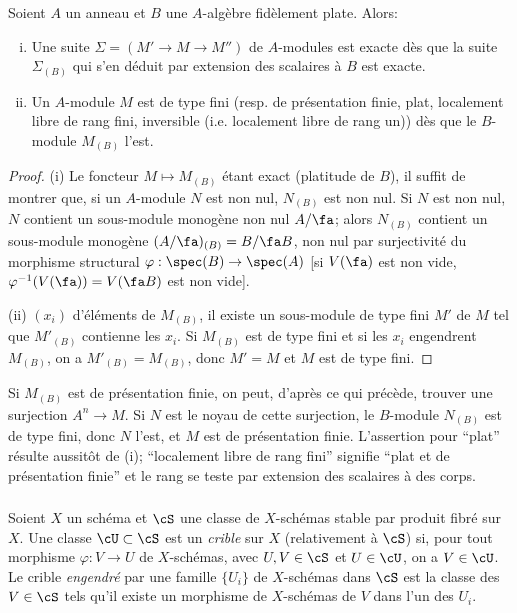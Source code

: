 \begin{proposition}\label{I:1-4-2}
Soient $A$ un anneau et $B$ une $A$-algèbre fidèlement plate. Alors:
\begin{enumerate}[(i)]
  \item Une suite $\Sigma=(M'\to M\to M'')$ de $A$-modules est exacte dès 
    que la suite $\Sigma_{(B)}$ qui s'en déduit par extension des scalaires 
    à $B$ est exacte.
  \item Un $A$-module $M$ est de type fini (resp. de présentation finie, 
    plat, localement libre de rang fini, inversible (i.e. localement libre 
    de rang un)) dès que le $B$-module $M_{(B)}$ l'est.
\end{enumerate}
\end{proposition}
\begin{proof}
(i) Le foncteur $M\mapsto M_{(B)}$ étant exact (platitude de $B$), il suffit 
de montrer que, si un $A$-module $N$ est non nul, $N_{(B)}$ est non nul. Si 
$N$ est non nul, $N$ contient un sous-module monogène non nul $A/\fa$; alors 
$N_{(B)}$ contient un sous-module monogène $(A/\fa)_{(B)} = B/\fa B$, non nul 
par surjectivité du morphisme structural $\varphi:\spec(B)\to\spec(A)$ [si 
$V(\fa)$ est non vide, $\varphi^{-1}(V(\fa))=V(\fa B)$ est non vide]. 

(ii)  $(x_i)$ d'éléments de $M_{(B)}$, il existe un 
sous-module de type fini $M'$ de $M$ tel que $M'_{(B)}$ contienne les $x_i$. Si 
$M_{(B)}$ est de type fini et si les $x_i$ engendrent $M_{(B)}$, on a 
$M'_{(B)}=M_{(B)}$, donc $M'=M$ et $M$ est de type fini. 
\end{proof}

Si $M_{(B)}$ est de présentation finie, on peut, d'après ce qui précède, 
trouver une surjection $A^n\to M$. Si $N$ est le noyau de cette surjection, le 
$B$-module $N_{(B)}$ est de type fini, donc $N$ l'est, et $M$ est de 
présentation finie. L'assertion pour ``plat'' résulte aussitôt de (i); 
``localement libre de rang fini'' signifie ``plat et de présentation finie'' 
et le rang se teste par extension des scalaires à des corps.





\subsubsection{}\label{I:1-4-3}

Soient $X$ un schéma et $\cS$ une classe de $X$-schémas stable par produit 
fibré sur $X$. Une classe $\cU\subset \cS$ est un \emph{crible} sur $X$ 
(relativement à $\cS$) si, pour tout morphisme $\varphi:V\to U$ de 
$X$-schémas, avec $U,V\in \cS$ et $U\in\cU$, on a $V\in \cU$. Le crible 
\emph{engendré} par une famille $\{U_i\}$ de $X$-schémas dans $\cS$ est la 
classe des $V\in\cS$ tels qu'il existe un morphisme de $X$-schémas de $V$ dans 
l'un des $U_i$. 






